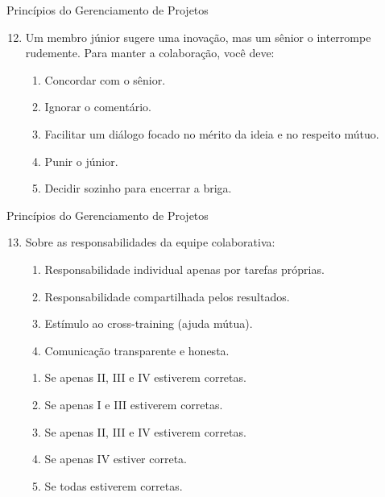 \documentclass{beamer}
\begin{document}
\begin{frame}{Princípios do Gerenciamento de Projetos}
	\begin{enumerate}
		\setcounter{enumi}{11}
		\justifying
		\item Um membro júnior sugere uma inovação, mas um sênior o interrompe rudemente. Para manter a colaboração, você deve:
		\begin{enumerate}[a]
			\item Concordar com o sênior.
			\item Ignorar o comentário.
			\item \alert<2>{Facilitar um diálogo focado no mérito da ideia e no respeito mútuo.}
			\item Punir o júnior.
			\item Decidir sozinho para encerrar a briga.
		\end{enumerate}
	\end{enumerate}
\end{frame}

\begin{frame}{Princípios do Gerenciamento de Projetos}
	\begin{enumerate}
		\setcounter{enumi}{12}
		\justifying
		\item Sobre as responsabilidades da equipe colaborativa:
		\begin{enumerate}[I]
			\item Responsabilidade individual apenas por tarefas próprias.
			\item Responsabilidade compartilhada pelos resultados.
			\item Estímulo ao cross-training (ajuda mútua).
			\item Comunicação transparente e honesta.
		\end{enumerate}
		\begin{enumerate}[a]
			\item Se apenas II, III e IV estiverem corretas.
			\item Se apenas I e III estiverem corretas.
			\item \alert<2>{Se apenas II, III e IV estiverem corretas.}
			\item Se apenas IV estiver correta.
			\item Se todas estiverem corretas.
		\end{enumerate}
	\end{enumerate}
\end{frame}
\end{document}
